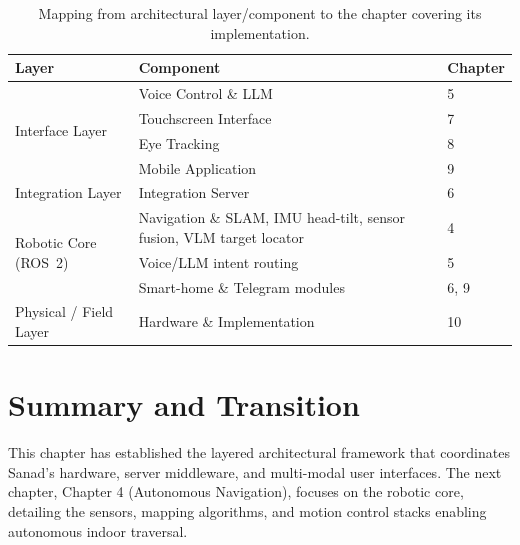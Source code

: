\begin{table}[H]
\centering
\caption{Mapping from architectural layer/component to the chapter covering its implementation.}
\begin{tabular}{|p{4.2cm}|p{6.3cm}|p{2.3cm}|}
\hline
\textbf{Layer} & \textbf{Component} & \textbf{Chapter} \\
\hline
\multirow{4}{4.2cm}{Interface Layer} & Voice Control \& LLM & 5 \\
\cline{2-3}
 & Touchscreen Interface & 7 \\
\cline{2-3}
 & Eye Tracking & 8 \\
\cline{2-3}
 & Mobile Application & 9 \\
\hline
Integration Layer & Integration Server & 6 \\
\hline
\multirow{3}{4.2cm}{Robotic Core (ROS~2)} & Navigation \& SLAM, IMU head-tilt, sensor fusion, VLM target locator & 4 \\
\cline{2-3}
 & Voice/LLM intent routing & 5 \\
\cline{2-3}
 & Smart-home \& Telegram modules & 6, 9 \\
\hline
Physical / Field Layer & Hardware \& Implementation & 10 \\
\hline
\end{tabular}
\label{table:chapter_roadmap}
\end{table}

\section{Summary and Transition}
This chapter has established the layered architectural framework that coordinates Sanad's hardware, server middleware, and multi-modal user interfaces. The next chapter, Chapter 4 (Autonomous Navigation), focuses on the robotic core, detailing the sensors, mapping algorithms, and motion control stacks enabling autonomous indoor traversal.
